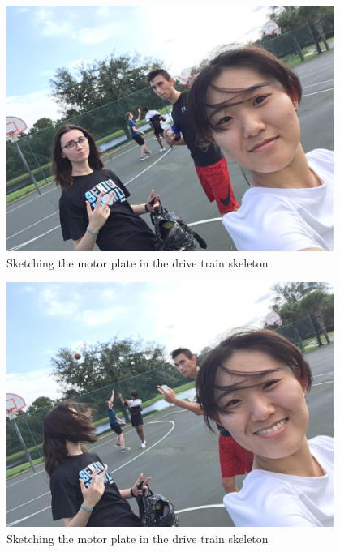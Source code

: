 \begin{figure}[htp]
\centering
\includegraphics[width=0.95\textwidth, angle=0]{Meetings/September/09-19-21/IMG_4074.JPG}
\caption{Sketching the motor plate in the drive train skeleton}
\label{fig:pic1}
\end{figure}

\begin{figure}[htp]
\centering
\includegraphics[width=0.95\textwidth, angle=0]{Meetings/September/09-19-21/IMG_4078.JPG}
\caption{Sketching the motor plate in the drive train skeleton}
\label{fig:pic2}
\end{figure}



